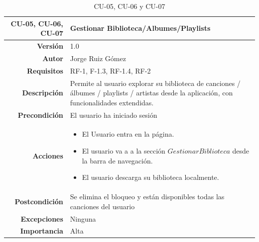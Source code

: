 \begin{table}[H]
    \centering
    \begin{tabular}{r|p{}}
    \hline
    \textbf{CU-05, CU-06, CU-07}         & \textbf{Gestionar Biblioteca/Albumes/Playlists}                                 \\ \hline
    \textbf{Versión}       & 1.0                                                     \\
    \textbf{Autor}         & Jorge Ruiz Gómez                                        \\
    \textbf{Requisitos}    & RF-1, F-1.3, RF-1.4, RF-2                                         \\
    \textbf{Descripción}   & Permite al usuario explorar su biblioteca de canciones / álbumes / playlists / artistas desde la aplicación, con funcionalidades extendidas. \\ \hline
    \textbf{Precondición}  & El usuario ha iniciado sesión  \\
    \textbf{Acciones}      &    \begin{itemize}
                                    \item El Usuario entra en la página.
                                    \item El usuario va a a la sección $Gestionar Biblioteca$ desde la barra de navegación.
                                    \item El usuario descarga su biblioteca localmente.
                                \end{itemize}\\
                                                                              
    \textbf{Postcondición} & Se elimina el bloqueo y están disponibles todas las canciones del usuario \\
    \textbf{Excepciones}   & Ninguna                                                 \\
    \textbf{Importancia}   & Alta                                                   \\ \hline
    \end{tabular}
    \caption{CU-05, CU-06 y CU-07}
    \label{tab:CUT-05}
\end{table}

